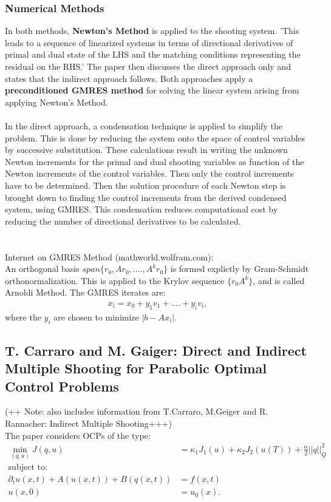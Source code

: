 \documentclass[11pt, a4paper]{article}
\theoremstyle{definition}
\begin{document}
\subsubsection{Numerical Methods}
In both methods, \textbf{Newton's Method} is applied to the shooting system. 'This leads to a sequence of linearized systems in terms of directional derivatives of primal and dual state of the LHS and the matching conditions representing the residual on the RHS.'
The paper then discusses the direct approach only and states that the indirect approach follows.
Both approaches apply a \textbf{preconditioned GMRES method} for solving the linear system arising from applying Newton's Method.
\\
\\
In the direct approach, a condensation technique is applied to simplify the problem. This is done by reducing the system onto the space of control variables by successive substitution.
These calculations result in writing the unknown Newton increments for the primal and dual shooting variables as function of the Newton increments of the control variables. Then only the control increments have to be determined.
Then the solution procedure of each Newton step is brought down to finding the control increments from the derived condensed system, using GMRES.
This condensation reduces computational cost by reducing the number of directional derivatives to be calculated.
\\
\\
\\
Internet on GMRES Method (mathworld.wolfram.com):\\
An orthogonal basis $span\{r_0,Ar_0,....,A^kr_0\}$ is formed explictly by Gram-Schmidt orthonormalization. This is applied to the Krylov sequence $\{r_0A^k\}$, and is called Arnoldi Method.
The GMRES iterates are:
\begin{align*}
x_i = x_0 + y_1v_1+....+y_iv_i,
\end{align*}
where the $y_i$ are chosen to minimize $|b-Ax_i|$.



\subsection{T. Carraro and M. Gaiger: Direct and Indirect Multiple Shooting for Parabolic Optimal Control Problems}
(++ Note: also includes information from T.Carraro, M.Geiger and R. Rannacher: Indirect Multiple Shooting+++)\\
The paper considers OCPs of the type:
\begin{align*}
\min_{(q,u)} J(q,u) &= \kappa_1 J_1(u) + \kappa_2 J_2(u(T)) + \frac{\alpha}{2} ||q||_Q^2\\
\text{subject to:}&\\
 \partial_t u(x,t) + A(u(x,t)) + B(q(x,t)) &= f(x,t)\\
 u(x,0)&=u_0(x).
\end{align*}
\end{document}
